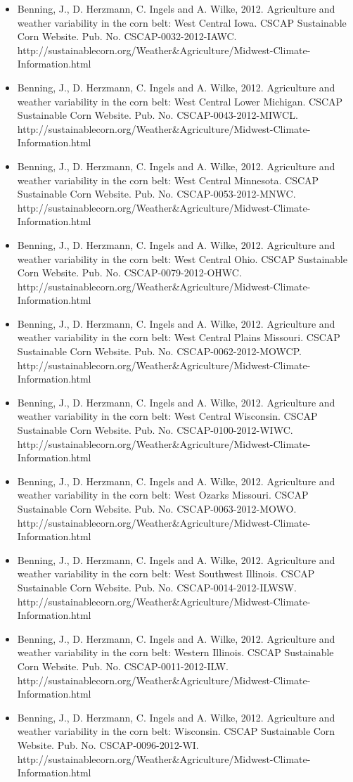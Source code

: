 \begin{itemize}
\item Benning, J., D. Herzmann, C. Ingels and A. Wilke, 2012. Agriculture and weather variability in the corn belt: West Central Iowa. CSCAP Sustainable Corn Website. Pub. No. CSCAP-0032-2012-IAWC. http://sustainablecorn.org/Weather\&Agriculture/Midwest-Climate-Information.html
\item Benning, J., D. Herzmann, C. Ingels and A. Wilke, 2012. Agriculture and weather variability in the corn belt: West Central Lower Michigan. CSCAP Sustainable Corn Website. Pub. No. CSCAP-0043-2012-MIWCL. http://sustainablecorn.org/Weather\&Agriculture/Midwest-Climate-Information.html
\item Benning, J., D. Herzmann, C. Ingels and A. Wilke, 2012. Agriculture and weather variability in the corn belt: West Central Minnesota. CSCAP Sustainable Corn Website. Pub. No. CSCAP-0053-2012-MNWC. http://sustainablecorn.org/Weather\&Agriculture/Midwest-Climate-Information.html
\item Benning, J., D. Herzmann, C. Ingels and A. Wilke, 2012. Agriculture and weather variability in the corn belt: West Central Ohio. CSCAP Sustainable Corn Website. Pub. No. CSCAP-0079-2012-OHWC. http://sustainablecorn.org/Weather\&Agriculture/Midwest-Climate-Information.html
\item Benning, J., D. Herzmann, C. Ingels and A. Wilke, 2012. Agriculture and weather variability in the corn belt: West Central Plains Missouri. CSCAP Sustainable Corn Website. Pub. No. CSCAP-0062-2012-MOWCP. http://sustainablecorn.org/Weather\&Agriculture/Midwest-Climate-Information.html
\item Benning, J., D. Herzmann, C. Ingels and A. Wilke, 2012. Agriculture and weather variability in the corn belt: West Central Wisconsin. CSCAP Sustainable Corn Website. Pub. No. CSCAP-0100-2012-WIWC. http://sustainablecorn.org/Weather\&Agriculture/Midwest-Climate-Information.html
\item Benning, J., D. Herzmann, C. Ingels and A. Wilke, 2012. Agriculture and weather variability in the corn belt: West Ozarks Missouri. CSCAP Sustainable Corn Website. Pub. No. CSCAP-0063-2012-MOWO. http://sustainablecorn.org/Weather\&Agriculture/Midwest-Climate-Information.html
\item Benning, J., D. Herzmann, C. Ingels and A. Wilke, 2012. Agriculture and weather variability in the corn belt: West Southwest Illinois. CSCAP Sustainable Corn Website. Pub. No. CSCAP-0014-2012-ILWSW. http://sustainablecorn.org/Weather\&Agriculture/Midwest-Climate-Information.html
\item Benning, J., D. Herzmann, C. Ingels and A. Wilke, 2012. Agriculture and weather variability in the corn belt: Western Illinois. CSCAP Sustainable Corn Website. Pub. No. CSCAP-0011-2012-ILW. http://sustainablecorn.org/Weather\&Agriculture/Midwest-Climate-Information.html
\item Benning, J., D. Herzmann, C. Ingels and A. Wilke, 2012. Agriculture and weather variability in the corn belt: Wisconsin. CSCAP Sustainable Corn Website. Pub. No. CSCAP-0096-2012-WI. http://sustainablecorn.org/Weather\&Agriculture/Midwest-Climate-Information.html
\end{itemize}

